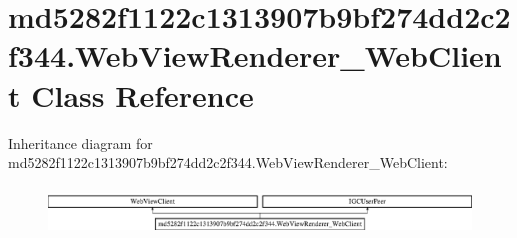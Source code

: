 \hypertarget{classmd5282f1122c1313907b9bf274dd2c2f344_1_1WebViewRenderer__WebClient}{}\section{md5282f1122c1313907b9bf274dd2c2f344.\+Web\+View\+Renderer\+\_\+\+Web\+Client Class Reference}
\label{classmd5282f1122c1313907b9bf274dd2c2f344_1_1WebViewRenderer__WebClient}
Inheritance diagram for md5282f1122c1313907b9bf274dd2c2f344.\+Web\+View\+Renderer\+\_\+\+Web\+Client\+:\begin{figure}[H]
\begin{center}
\leavevmode
\includegraphics[height=1.296296cm]{classmd5282f1122c1313907b9bf274dd2c2f344_1_1WebViewRenderer__WebClient}
\end{center}
\end{figure}

